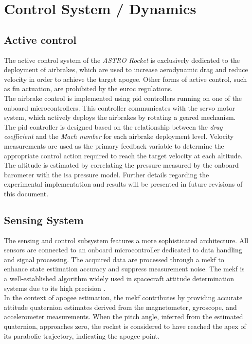 \section{Control System / Dynamics}

\subsection{Active control}

The active control system of the \emph{ASTRO Rocket} is exclusively dedicated to the deployment of airbrakes, which are used to increase aerodynamic drag and reduce velocity in order to achieve the target apogee. Other forms of active control, such as fin actuation, are prohibited by the \acrfull{euroc} regulations.\\

The airbrake control is implemented using \acrshort{pid} controllers running on one of the onboard microcontrollers. This controller communicates with the servo motor system, which actively deploys the airbrakes by rotating a geared mechanism. The \acrshort{pid} controller is designed based on the relationship between the \emph{drag coefficient} and the \emph{Mach number} for each airbrake deployment level. Velocity measurements are used as the primary feedback variable to determine the appropriate control action required to reach the target velocity at each altitude. The altitude is estimated by correlating the pressure measured by the onboard barometer with the \acrfull{isa} pressure model. Further details regarding the experimental implementation and results will be presented in future revisions of this document.

\subsection{Sensing System}

The sensing and control subsystem features a more sophisticated architecture. All sensors are connected to an onboard microcontroller dedicated to data handling and signal processing. The acquired data are processed through a \acrfull{mekf} to enhance state estimation accuracy and suppress measurement noise. The \acrshort{mekf} is a well-established algorithm widely used in spacecraft attitude determination systems due to its high precision \citep{Markley2023Error_Covariance}.\\

In the context of apogee estimation, the \acrshort{mekf} contributes by providing accurate attitude quaternion estimates derived from the magnetometer, gyroscope, and accelerometer measurements. When the pitch angle, inferred from the estimated quaternion, approaches zero, the rocket is considered to have reached the apex of its parabolic trajectory, indicating the apogee point.\\
